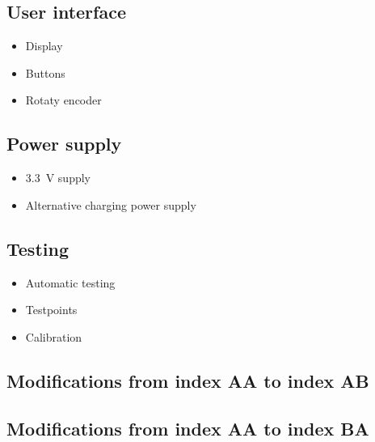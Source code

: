\FloatBarrier

\subsection{User interface}
\label{sec_ui}
\begin{itemize}
    \item Display
    \item Buttons
    \item Rotaty encoder
\end{itemize}

\FloatBarrier

\subsection{Power supply}
\label{sec_power_supply}
\begin{itemize}
    \item \qty{3.3}{\volt} supply
    \item Alternative charging power supply
\end{itemize}

\FloatBarrier

\subsection{Testing}
\label{sec_testing}
\begin{itemize}
    \item Automatic testing
    \item Testpoints
    \item Calibration
\end{itemize}

\FloatBarrier

\subsection{Modifications from index AA to index AB}

\subsection{Modifications from index AA to index BA}
